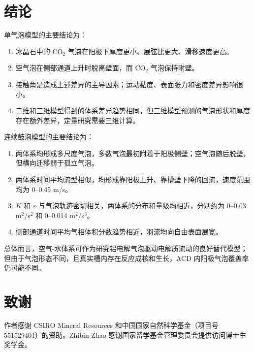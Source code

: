 \documentclass[UTF8,zihao=-4,fontset=fandol]{ctexart}
\begin{document}
\section{结论}
单气泡模型的主要结论为：
\begin{enumerate}[label=\arabic*.]
\item 冰晶石中的 CO$_2$ 气泡在阳极下厚度更小、展弦比更大、滑移速度更高。
\item 空气泡在侧部通道上升时脱离壁面，而 CO$_2$ 气泡保持附壁。
\item 接触角是造成上述差异的主导因素；运动黏度、表面张力和密度差异影响很小。
\item 二维和三维模型得到的体系差异趋势相同，但三维模型预测的气泡形状和厚度存在额外差异，定量研究需要三维计算。
\end{enumerate}
连续鼓泡模型的主要结论为：
\begin{enumerate}[label=\arabic*.]
\item 两体系均形成多尺度气泡，多数气泡最初附着于阳极侧壁；空气泡随后脱壁，但横向迁移弱于孤立气泡。
\item 两体系时间平均流型相似，均形成靠阳极上升、靠槽壁下降的回流，速度范围均为 0--0.45 m/s。
\item $K$ 和 $\varepsilon$ 与气泡轨迹密切相关，两体系的分布和量级均相近，分别约为 0--0.03 m$^2$/s$^2$ 和 0--0.014 m$^2$/s$^3$。
\item 侧部通道时间平均气相体积分数趋势相近，羽流均向自由表面展宽。
\end{enumerate}
总体而言，空气-水体系可作为研究铝电解气泡驱动电解质流动的良好替代模型；但由于气泡形态不同，且真实槽内存在反应成核和生长，ACD 内阳极气泡覆盖率仍可能不同。

\section*{致谢}
作者感谢 CSIRO Mineral Resources 和中国国家自然科学基金（项目号 551529401）的资助。Zhibin Zhao 感谢国家留学基金管理委员会提供访问博士生奖学金。
\end{document}
